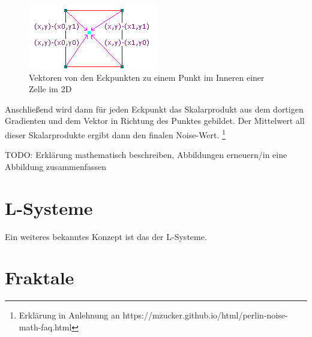 \begin{figure}[h]
    \centering
    \includegraphics[height=\imgHeight]{images/noise_vectors.png}
    \caption{Vektoren von den Eckpunkten zu einem Punkt im Inneren einer Zelle im 2D}
    \label{fig:noise_vectors}
\end{figure}

Anschließend wird dann für jeden Eckpunkt
das Skalarprodukt aus dem dortigen Gradienten und dem Vektor in Richtung des Punktes gebildet. Der Mittelwert all dieser Skalarprodukte ergibt
dann den finalen Noise-Wert. \cite{16_perlin}\footnote{Erklärung in Anlehnung an https://mzucker.github.io/html/perlin-noise-math-faq.html}

TODO: Erklärung mathematisch beschreiben, Abbildungen erneuern/in eine Abbildung zusammenfassen

\section{L-Systeme}
Ein weiteres bekanntes Konzept ist das der L-Systeme.

\section{Fraktale}
\cite{19_mandelbrot_frame}